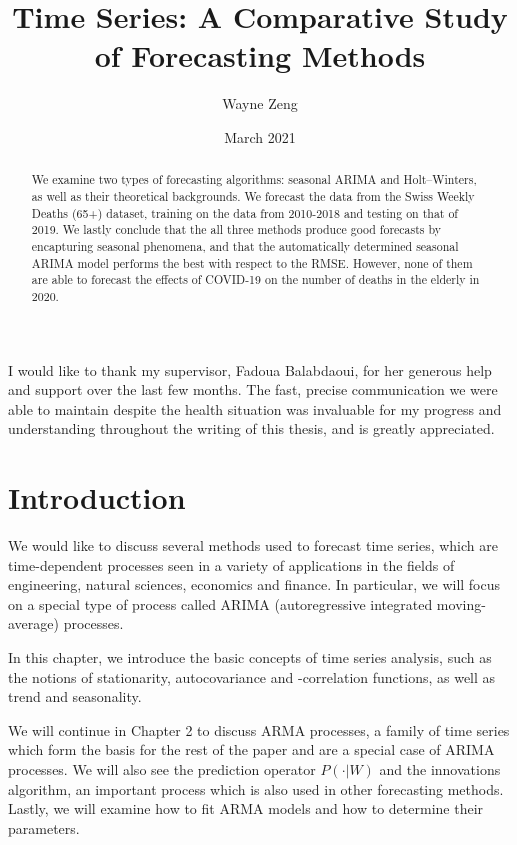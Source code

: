 \documentclass[a4paper, oneside]{discothesis}
\title{Time Series: A Comparative Study of Forecasting Methods}
\author{Wayne Zeng}
\institute{D-MATH \\
ETH Zürich}
\date{March 2021}
\begin{document}
\frontmatter %
\maketitle

\cleardoublepage

\begin{acknowledgements}
	I would like to thank my supervisor, Fadoua Balabdaoui, for her generous help and support over the last few months. The fast, precise communication we were able to maintain despite the health situation was invaluable for my progress and understanding throughout the writing of this thesis, and is greatly appreciated.
\end{acknowledgements}


\begin{abstract}
    We examine two types of forecasting algorithms: seasonal ARIMA and Holt--Winters, as well as their theoretical backgrounds. We forecast the data from the Swiss Weekly Deaths (65+) dataset, training on the data from 2010-2018 and testing on that of 2019. We lastly conclude that the all three methods produce good forecasts by encapturing seasonal phenomena, and that the automatically determined seasonal ARIMA model performs the best with respect to the RMSE. However, none of them are able to forecast the effects of COVID-19 on the number of deaths in the elderly in 2020.
\end{abstract}

\tableofcontents
\mainmatter %


\chapter{Introduction}

We would like to discuss several methods used to forecast time series, which are time-dependent processes seen in a variety of applications in the fields of engineering, natural sciences, economics and finance. In particular, we will focus on a special type of process called ARIMA (autoregressive integrated moving-average) processes.

In this chapter, we introduce the basic concepts of time series analysis, such as the notions of stationarity, autocovariance and -correlation functions, as well as trend and seasonality.

We will continue in Chapter 2 to discuss ARMA processes, a family of time series which form the basis for the rest of the paper and are a special case of ARIMA processes. We will also see the prediction operator $P(\cdot | W)$ and the innovations algorithm, an important process which is also used in other forecasting methods. Lastly, we will examine how to fit ARMA models and how to determine their parameters.
\end{document}
